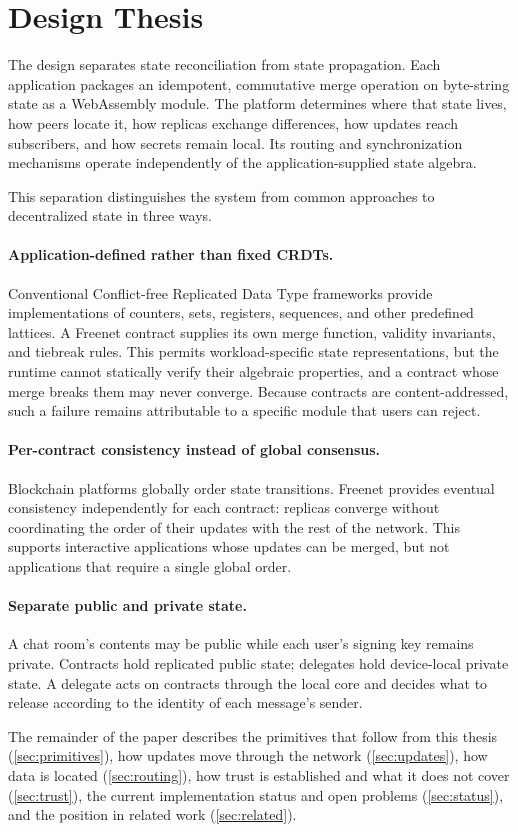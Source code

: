 \section{Design Thesis}
\label{sec:thesis}

The design separates state reconciliation from state propagation. Each application packages an idempotent, commutative merge operation on byte-string state as a WebAssembly module. The platform determines where that state lives, how peers locate it, how replicas exchange differences, how updates reach subscribers, and how secrets remain local. Its routing and synchronization mechanisms operate independently of the application-supplied state algebra.

This separation distinguishes the system from common approaches to decentralized state in three ways.

\paragraph{Application-defined rather than fixed CRDTs.} Conventional Conflict-free Replicated Data Type \citep{shapiro2011crdt} frameworks provide implementations of counters, sets, registers, sequences, and other predefined lattices. A Freenet contract supplies its own merge function, validity invariants, and tiebreak rules. This permits workload-specific state representations, but the runtime cannot statically verify their algebraic properties, and a contract whose merge breaks them may never converge. Because contracts are content-addressed, such a failure remains attributable to a specific module that users can reject.

\paragraph{Per-contract consistency instead of global consensus.} Blockchain platforms globally order state transitions. Freenet provides eventual consistency independently for each contract: replicas converge without coordinating the order of their updates with the rest of the network. This supports interactive applications whose updates can be merged, but not applications that require a single global order.

\paragraph{Separate public and private state.} A chat room's contents may be public while each user's signing key remains private. Contracts hold replicated public state; delegates hold device-local private state. A delegate acts on contracts through the local core and decides what to release according to the identity of each message's sender.

The remainder of the paper describes the primitives that follow from this thesis (\cref{sec:primitives}), how updates move through the network (\cref{sec:updates}), how data is located (\cref{sec:routing}), how trust is established and what it does not cover (\cref{sec:trust}), the current implementation status and open problems (\cref{sec:status}), and the position in related work (\cref{sec:related}).
